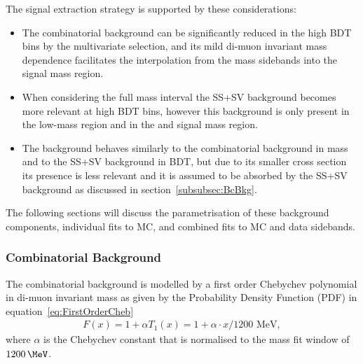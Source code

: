 The signal extraction strategy is supported by these considerations:
\begin{itemize}
   \item The combinatorial background can be significantly reduced in the high BDT bins by the multivariate selection, and its mild di-muon invariant mass dependence facilitates the interpolation from the mass sidebands into the signal mass region.
   \item When considering the full mass interval the SS+SV background becomes more relevant at high BDT bins, however this background is only present in the low-mass region and  in the \Bdmumu and \Bsmumu signal mass region.
   \item The \Bc background behaves similarly to the combinatorial background in mass and to the SS+SV background in BDT, but due to its smaller cross section its presence is less relevant and it is assumed to be absorbed by the SS+SV background as discussed in section~\ref{subsubsec:BcBkg}.   
\end{itemize}
The following sections will discuss the parametrisation of these background components, individual fits to MC, and combined fits to MC and data sidebands.

\clearpage

\subsubsection{Combinatorial Background}
\label{subsubsec:COMBbkg}

The combinatorial background is modelled by a first order Chebychev polynomial in di-muon invariant mass as given by the Probability Density Function (PDF) in equation~\ref{eq:FirstOrderCheb}
\begin{eqnarray}
  F(x) = 1 + \alpha T_{1}(x) = 1 + \alpha\cdot x/\text{1200 MeV}
  \label{eq:FirstOrderCheb},
\end{eqnarray}
where $\alpha$ is the Chebychev constant that is normalised to the mass fit window of $1200\,\MeV$.

